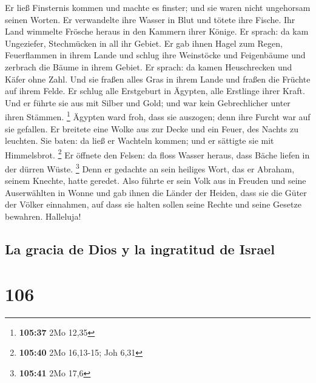  Er ließ Finsternis kommen und machte es finster; und sie
waren nicht ungehorsam seinen Worten.  Er verwandelte
ihre Wasser in Blut und tötete ihre Fische.  Ihr Land
wimmelte Frösche heraus in den Kammern ihrer Könige.  Er
sprach: da kam Ungeziefer, Stechmücken in all ihr Gebiet.
 Er gab ihnen Hagel zum Regen, Feuerflammen in ihrem
Lande  und schlug ihre Weinstöcke und Feigenbäume und
zerbrach die Bäume in ihrem Gebiet.  Er sprach: da kamen
Heuschrecken und Käfer ohne Zahl.  Und sie fraßen alles
Gras in ihrem Lande und fraßen die Früchte auf ihrem Felde.
 Er schlug alle Erstgeburt in Ägypten, alle Erstlinge
ihrer Kraft.  Und er führte sie aus mit Silber und Gold;
und war kein Gebrechlicher unter ihren Stämmen. \footnote{\textbf{105:37}
  2Mo 12,35}  Ägypten ward froh, dass sie auszogen; denn
ihre Furcht war auf sie gefallen.  Er breitete eine Wolke
aus zur Decke und ein Feuer, des Nachts zu leuchten.  Sie
baten: da ließ er Wachteln kommen; und er sättigte sie mit Himmelsbrot.
\footnote{\textbf{105:40} 2Mo 16,13-15; Joh 6,31}  Er
öffnete den Felsen: da floss Wasser heraus, dass Bäche liefen in der
dürren Wüste. \footnote{\textbf{105:41} 2Mo 17,6}  Denn
er gedachte an sein heiliges Wort, das er Abraham, seinem Knechte, hatte
geredet.  Also führte er sein Volk aus in Freuden und
seine Auserwählten in Wonne  und gab ihnen die Länder der
Heiden, dass sie die Güter der Völker einnahmen,  auf
dass sie halten sollen seine Rechte und seine Gesetze bewahren.
Halleluja!

\hypertarget{la-gracia-de-dios-y-la-ingratitud-de-israel}{%
\subsection{La gracia de Dios y la ingratitud de
Israel}\label{la-gracia-de-dios-y-la-ingratitud-de-israel}}

\hypertarget{section-105}{%
\section{106}\label{section-105}}

